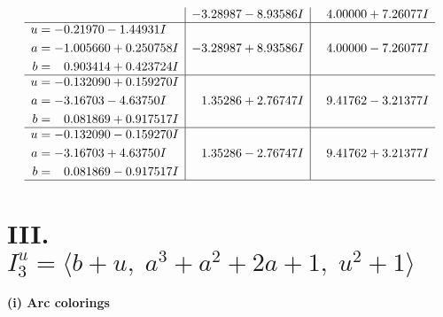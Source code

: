 \documentclass[1p]{elsarticle_modified}
\theoremstyle{definition}
\begin{document}
$$\begin{array}{c|c|c}
 & -3.28987 - 8.93586 I & \phantom{-}4.00000 + 7.26077 I \\ \hline\begin{aligned}
u &= -0.21970 - 1.44931 I \\
a &= -1.005660 + 0.250758 I \\
b &= \phantom{-}0.903414 + 0.423724 I\end{aligned}
 & -3.28987 + 8.93586 I & \phantom{-}4.00000 - 7.26077 I \\ \hline\begin{aligned}
u &= -0.132090 + 0.159270 I \\
a &= -3.16703 - 4.63750 I \\
b &= \phantom{-}0.081869 + 0.917517 I\end{aligned}
 & \phantom{-}1.35286 + 2.76747 I & \phantom{-}9.41762 - 3.21377 I \\ \hline\begin{aligned}
u &= -0.132090 - 0.159270 I \\
a &= -3.16703 + 4.63750 I \\
b &= \phantom{-}0.081869 - 0.917517 I\end{aligned}
 & \phantom{-}1.35286 - 2.76747 I & \phantom{-}9.41762 + 3.21377 I\\
 \hline 
 \end{array}$$\newpage\newpage\renewcommand{\arraystretch}{1}
\centering \section*{III. $I^u_{3}= \langle b+u,\;a^3+a^2+2 a+1,\;u^2+1 \rangle$}
\flushleft \textbf{(i) Arc colorings}\\
\end{document}
